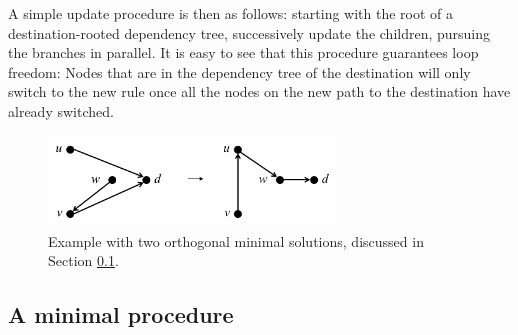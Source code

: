A simple update procedure is then as follows: starting with the root of a destination-rooted dependency tree, successively update the children, pursuing the branches in parallel.
It is easy to see that this procedure guarantees loop freedom: Nodes that are in the dependency tree of the destination will only switch to the new rule once all the nodes on the new path to the destination have already switched.








\begin{figure}[t!]
\includegraphics[width=3in]{figures/nominimum.png}
\caption{Example with two orthogonal minimal solutions, discussed in Section \ref{sec:minimal}.}
\label{fig:minimal}
\end{figure}

\subsection{A minimal procedure}
\label{sec:minimal}


